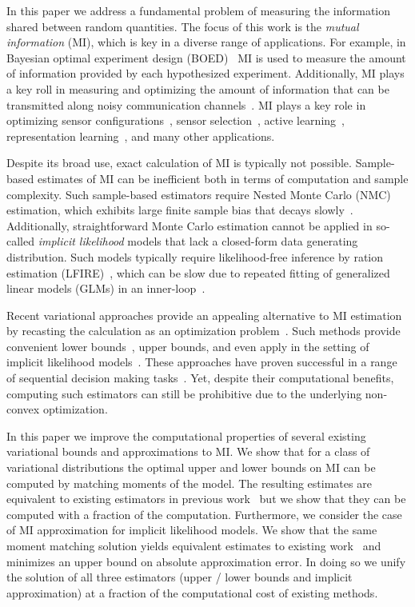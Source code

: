 In this paper we address a fundamental problem of measuring the
information shared between random quantities.  The focus of this work
is the \emph{mutual information} (MI), which is key in a diverse range
of applications.  For example, in Bayesian optimal experiment design
(BOED)~\cite{lindley56, blackwell50, bernardo79a} MI is used to
measure the amount of information provided by each hypothesized
experiment.  Additionally, MI plays a key roll in measuring and
optimizing the amount of information that can be transmitted along
noisy communication channels~\cite{Cover2006, mackay2003information}.
MI plays a key role in optimizing sensor
configurations~\cite{krause05efficientalgos}, sensor
selection~\cite{WilliamsThesis}, active
learning~\cite{settles2012active}, representation
learning~\cite{tishby2000information}, and many other applications.

Despite its broad use, exact calculation of MI is typically not
possible.  Sample-based estimates of MI can be inefficient both in
terms of computation and sample complexity.  Such sample-based
estimators require Nested Monte Carlo (NMC) estimation, which exhibits
large finite sample bias that decays slowly~\cite{zheng2018robust,
rainforth2018nesting}. Additionally, straightforward Monte Carlo
estimation cannot be applied in so-called \emph{implicit likelihood}
models that lack a closed-form data generating distribution.  Such
models typically require likelihood-free inference by ration
estimation (LFIRE)~\cite{thomas2022likelihood}, which can be slow due
to repeated fitting of generalized linear models (GLMs) in an
inner-loop~\cite{kleinegesse2021sequential}.

Recent variational approaches provide an appealing alternative to MI
estimation by recasting the calculation as an optimization
problem~\cite{poole2019variational}.  Such methods provide convenient
lower bounds~\cite{agakov2004algorithm}, upper bounds, and even apply
in the setting of implicit likelihood models~\cite{Foster2019}.  These
approaches have proven successful in a range of sequential decision
making tasks~\cite{pacheco2019variational, foster2020unified}.  Yet,
despite their computational benefits, computing such estimators can
still be prohibitive due to the underlying non-convex optimization.

In this paper we improve the computational properties of several
existing variational bounds and approximations to MI.  We show that
for a class of variational distributions the optimal upper and lower
bounds on MI can be computed by matching moments of the model.  The
resulting estimates are equivalent to existing estimators in previous
work~\cite{poole2019variational, agakov2004algorithm} but we show that
they can be computed with a fraction of the computation.  Furthermore,
we consider the case of MI approximation for implicit likelihood
models.  We show that the same moment matching solution yields
equivalent estimates to existing work~\cite{Foster2019} and minimizes
an upper bound on absolute approximation error.  In doing so we unify
the solution of all three estimators (upper / lower bounds and
implicit approximation) at a fraction of the computational cost of
existing methods.  

